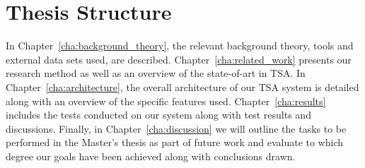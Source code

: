 \section{Thesis Structure}
In Chapter~\ref{cha:background_theory}, the relevant background theory, tools and external data sets used, are described. Chapter~\ref{cha:related_work} presents our research method as well as an overview of the state-of-art in TSA. In Chapter~\ref{cha:architecture}, the overall architecture of our TSA system is detailed along with an overview of the specific features used. Chapter~\ref{cha:results} includes the tests conducted on our system along with test results and discussions. Finally, in Chapter~\ref{cha:discussion} we will outline the tasks to be performed in the Master's thesis as part of future work and evaluate to which degree our goals have been achieved along with conclusions drawn.   

\glsresetall